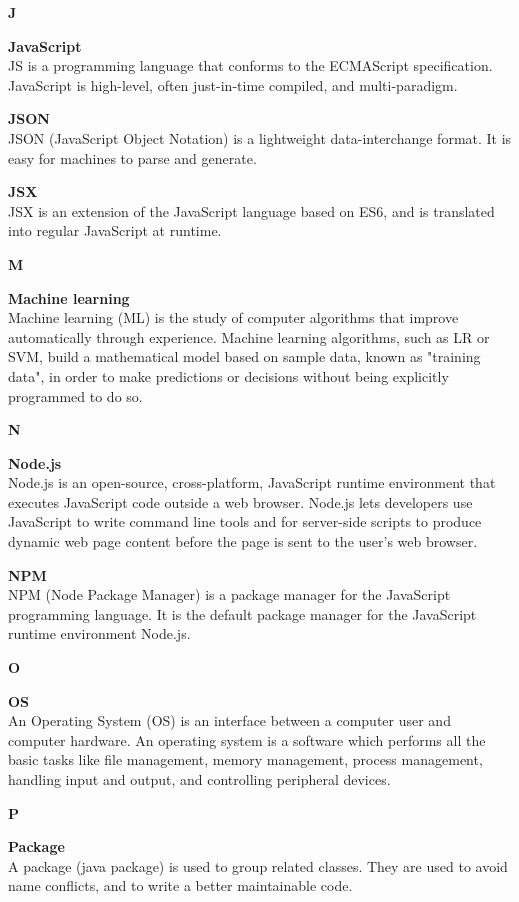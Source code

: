 {\Large\textbf{J}\par}
\textbf{JavaScript}\\
JS is a programming language that conforms to the ECMAScript specification. JavaScript is high-level, often just-in-time compiled, and multi-paradigm. 

\textbf{JSON}\\
JSON (JavaScript Object Notation) is a lightweight data-interchange format. It is easy for machines to parse and generate.

\textbf{JSX}\\
JSX is an extension of the JavaScript language based on ES6, and is translated into regular JavaScript at runtime.

{\Large\textbf{M}\par}
\textbf{Machine learning}\\
Machine learning (ML) is the study of computer algorithms that improve automatically through experience. Machine learning algorithms, such as LR or SVM, build a mathematical model based on sample data, known as "training data", in order to make predictions or decisions without being explicitly programmed to do so.

{\Large\textbf{N}\par}
\textbf{Node.js}\\
Node.js is an open-source, cross-platform, JavaScript runtime environment that executes JavaScript code outside a web browser. Node.js lets developers use JavaScript to write command line tools and for server-side scripts to produce dynamic web page content before the page is sent to the user's web browser.

\textbf{NPM}\\
NPM (Node Package Manager) is a package manager for the JavaScript programming language. It is the default package manager for the JavaScript runtime environment Node.js.

{\Large\textbf{O}\par}
\textbf{OS}\\
An Operating System (OS) is an interface between a computer user and computer hardware. An operating system is a software which performs all the basic tasks like file management, memory management, process management, handling input and output, and controlling peripheral devices.

{\Large\textbf{P}\par}
\textbf{Package}\\
A package (java package) is used to group related classes. They are used to avoid name conflicts, and to write a better maintainable code. 

